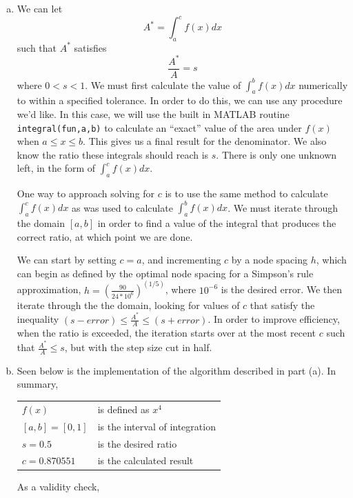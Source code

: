 \documentclass[11pt]{article}
\begin{document}
\begin{enumerate}
\begin{enumerate}[(a)]
		\item We can let
		\[
		A^* = \int_{a}^{c}f(x)dx
		\]
		such that $A^*$ satisfies
		\[
		\frac{A^*}{A} = s
		\]
		where $0<s<1$. We must first calculate the value of $\int_{a}^{b}f(x)dx$ numerically to within a specified tolerance. In order to do this, we can use any procedure we'd like. In this case, we will use the built in MATLAB routine \texttt{integral(fun,a,b)} to calculate an ``exact'' value of the area under $f(x)$ when $a\leq x \leq b$. This gives us a final result for the denominator. We also know the ratio these integrals should reach is $s$. There is only one unknown left, in the form of $\int_{a}^{c}f(x)dx$.

		\medskip

		One way to approach solving for $c$ is to use the same method to calculate $\int_{a}^{c}f(x)dx$ as was used to calculate $\int_{a}^{b}f(x)dx$. We must iterate through the domain $[a,b]$ in order to find a value of the integral that produces the correct ratio, at which point we are done.

		\medskip

		We can start by setting $c=a$, and incrementing $c$ by a node spacing $h$, which can begin as defined by the optimal node spacing for a Simpson's rule approximation, $h = (\frac{90}{24*10^6})^(1/5)$, where $10^{-6}$ is the desired error. We then iterate through the the domain, looking for values of $c$ that satisfy the inequality $(s - error) \leq \frac{A^*}{A} \leq (s + error)$. In order to improve efficiency, when the ratio is exceeded, the iteration starts over at the most recent $c$ such that $\frac{A^*}{A} \leq s$, but with the step size cut in half.

		\medskip

		\item Seen below is the implementation of the algorithm described in part (a). In summary,
		\begin{center}
		\begin{tabular}{ll}
		$f(x)$ & is defined as $x^4$ \\
		$[a,b] = [0,1]$ & is the interval of integration \\
		$s = 0.5$ & is the desired ratio \\
		$c = 0.870551$ & is the calculated result \\
		\end{tabular}
		\end{center}

		\medskip

		As a validity check,


\end{enumerate}
\end{enumerate}
\end{document}
